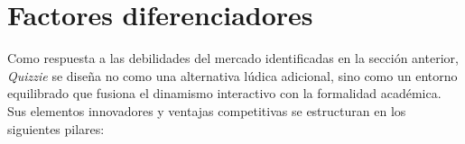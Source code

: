 \begin{table}[H]
\centering
\small
\renewcommand{\arraystretch}{1.5}
\caption{Tabla comparativa del mercado.}
\label{tab:comparativa_mercado}
\end{table}

\section{Factores diferenciadores}\label{sec:factores_diferenciadores}

Como respuesta a las debilidades del mercado identificadas en la sección anterior, \textit{Quizzie} se diseña no como una alternativa lúdica adicional, sino como un entorno equilibrado que fusiona el dinamismo interactivo con la formalidad académica. Sus elementos innovadores y ventajas competitivas se estructuran en los siguientes pilares:

